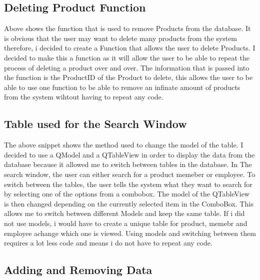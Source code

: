 \subsection{Deleting Product Function}
\begin{figure}[H]
\end{figure}
 Above shows the function that is used to remove Products from the database. It is obvious that the user may want to delete many products from the system therefore, i decided to create a Function that allows the user to delete Products. I decided to make this a function as it will allow the user to be able to repeat the process of deleting a product over and over. The information that is passed into the function is the ProductID of the Product to delete, this allows the user to be able to use one function to be able to remove an infinate amount of products from the system wihtout having to repeat any code.

\subsection{Table used for the Search Window}
\begin{figure}[H]
\end{figure}

The above snippet shows the method used to change the model of the table. I decided to use a QModel and a QTableView in order to display the data from the database because it allowed me to switch between tables in the database. In The search window, the user can either search for a product memeber or employee. To switch between the tables, the user tells the system what they want to search for by selecting one of the options from a combobox. The model of the QTableView is then changed depending on the currently selected item in the ComboBox. This allows me to switch between different Models and keep the same table. If i did not use models, i would have to create a unique table for product, memebr and employee achange which one is viewed. Using models and switching between them requires a lot less code and means i do not have to repeat any code.

\subsection{Adding and Removing Data}
\begin{figure}[H]
\end{figure}

